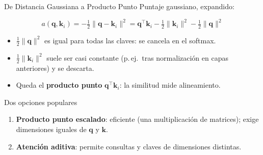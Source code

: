 \documentclass[aspectratio=169, 10pt]{beamer}
\newcommand{\qv}{\mathbf{q}}
\newcommand{\kv}{\mathbf{k}}
\newcommand{\formula}[1]{%
	\begin{tcolorbox}[colback=UCMBlue!8, colframe=UCMBlue, arc=4pt,
		boxsep=2pt, left=6pt, right=6pt, top=3pt, bottom=3pt]
		#1
	\end{tcolorbox}
}
\begin{document}
\begin{frame}{De Distancia Gaussiana a Producto Punto}
	Puntaje gaussiano, expandido:
	\formula{
		\[
		a(\qv,\kv_i)=-\tfrac12\|\qv-\kv_i\|^2
		=\qv^\top\kv_i-\tfrac12\|\kv_i\|^2-\tfrac12\|\qv\|^2
		\]
	}
	\begin{itemize}
		\item $\tfrac12\|\qv\|^2$ es igual para todas las claves: se cancela en el softmax.
		\item $\tfrac12\|\kv_i\|^2$ suele ser casi constante (p.\,ej.\ tras normalizaci\'on en capas anteriores) y se descarta.
		\item Queda el \textbf{producto punto} $\qv^\top\kv_i$: la similitud mide alineamiento.
	\end{itemize}
	\begin{block}{Dos opciones populares}
		\small
		\begin{enumerate}
			\item \textbf{Producto punto escalado}: eficiente (una multiplicaci\'on de matrices); exige dimensiones iguales de $\qv$ y $\kv$.
			\item \textbf{Atenci\'on aditiva}: permite consultas y claves de dimensiones distintas.
		\end{enumerate}
	\end{block}
\end{frame}
\end{document}
